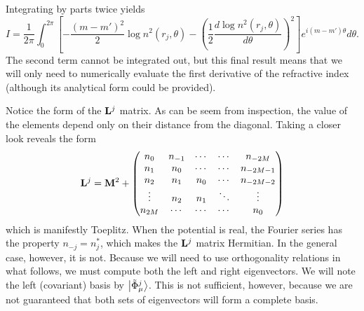 Integrating by parts twice yields
  \begin{equation}
   I = \frac{1}{2\pi}\int_0^{2\pi}\left[-\frac{(m-m')^2}{2}\log n^2(r_j,\theta)-\left(\frac{1}{2}\frac{d\log n^2(r_j,\theta)}{d\theta}\right)^2\right]e^{i(m-m')\theta}d\theta.
  \end{equation}
The second term cannot be integrated out, but this final result means that
we will only need to numerically evaluate the first derivative of the 
refractive index (although its analytical form could be provided).

Notice the form of the $\mathbf{L}^j$ matrix. As can be seem from inspection, 
the value of the elements depend only on their distance from the diagonal.
Taking a closer look reveals the form
  \begin{equation}
   \mathbf{L}^j = \mathbf{M}^2 +\begin{pmatrix} 
		  n_0 & n_{-1} & \cdots & \cdots & n_{-2M}	\\
		  n_1	  & n_0& \cdots & \cdots & n_{-2M-1}\\
		  n_2	  & n_1	   & n_0& \cdots & n_{-2M-2}\\
		  \vdots  & n_2    & n_1    & \ddots & \vdots   \\
		  n_{2M}  & \cdots & \cdots & \cdots & n_0
		\end{pmatrix}
  \end{equation}
which is manifestly Toeplitz. When the potential is real, the Fourier
series has the property $n_{-j}=n_j^*$, which makes the $\mathbf{L}^j$ 
matrix Hermitian. In the general case, however, it is not. Because
we will need to use orthogonality relations in what follows, we must
compute both the left and right eigenvectors. 
We will note the left (covariant) basis by $\Ket{\tilde{\Phi}_\mu^j}$.
This is not sufficient, however, because we are not guaranteed that
both sets of eigenvectors will form a complete basis. 


